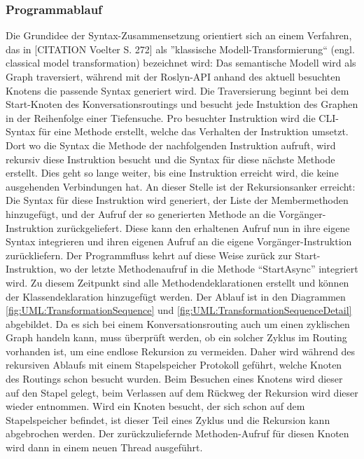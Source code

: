 \subsubsection{Programmablauf}
\label{subsubsec:Programablauf}
Die Grundidee der Syntax-Zusammensetzung orientiert sich an einem Verfahren, das in [CITATION Voelter S. 272] als ''klassische Modell-Transformierung`` (engl. classical model transformation) bezeichnet wird: Das semantische Modell wird als Graph traversiert, während mit der Roslyn-API anhand des aktuell besuchten Knotens die passende Syntax generiert wird. Die Traversierung beginnt bei dem Start-Knoten des Konversationsroutings und besucht jede Instuktion des Graphen in der Reihenfolge einer Tiefensuche. Pro besuchter Instruktion wird die CLI-Syntax für eine Methode erstellt, welche das Verhalten der Instruktion umsetzt. Dort wo die Syntax die Methode der nachfolgenden Instruktion aufruft, wird rekursiv diese Instruktion besucht und die Syntax für diese nächste Methode erstellt. Dies geht so lange weiter, bis eine Instruktion erreicht wird, die keine ausgehenden Verbindungen hat. An dieser Stelle ist der Rekursionsanker erreicht: Die Syntax für diese Instruktion wird generiert, der Liste der Membermethoden hinzugefügt, und der Aufruf der so generierten Methode an die Vorgänger-Instruktion zurückgeliefert. Diese kann den erhaltenen Aufruf nun in ihre eigene Syntax integrieren und ihren eigenen Aufruf an die eigene Vorgänger-Instruktion zurückliefern. Der Programmfluss kehrt auf diese Weise zurück zur Start-Instruktion, wo der letzte Methodenaufruf in die Methode ``StartAsync'' integriert wird. Zu diesem Zeitpunkt sind alle Methodendeklarationen erstellt und können der Klassendeklaration hinzugefügt werden. Der Ablauf ist in den Diagrammen \ref{fig:UML:TransformationSequence} und \ref{fig:UML:TransformationSequenceDetail} abgebildet.
\newline
Da es sich bei einem Konversationsrouting auch um einen zyklischen Graph handeln kann, muss überprüft werden, ob ein solcher Zyklus im Routing vorhanden ist, um eine endlose Rekursion zu vermeiden. Daher wird während des rekursiven Ablaufs mit einem Stapelspeicher Protokoll geführt, welche Knoten des Routings schon besucht wurden. Beim Besuchen eines Knotens wird dieser auf den Stapel gelegt, beim Verlassen auf dem Rückweg der Rekursion wird dieser wieder entnommen. Wird ein Knoten besucht, der sich schon auf dem Stapelspeicher befindet, ist dieser Teil eines Zyklus und die Rekursion kann abgebrochen werden. Der zurückzuliefernde Methoden-Aufruf für diesen Knoten wird dann in einem neuen Thread ausgeführt. 

